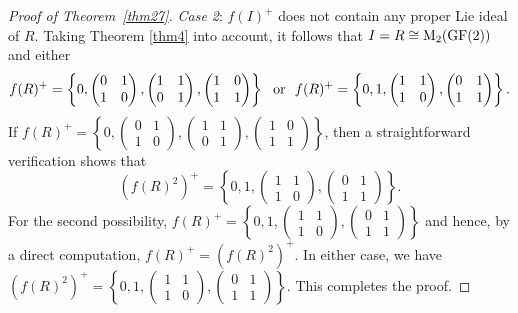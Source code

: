 \documentclass[11pt]{article}
\theoremstyle{definition}
\begin{document}
{{{{\begin{proof}[Proof of Theorem~\ref{thm27}]
					\textit{Case 2}: $f(I)^+$ does not contain any proper Lie ideal of $R$. 	Taking Theorem \ref{thm4} into account, it follows that
$I=R\cong {\rm M}_2({\rm GF}(2))$ and either
$$
f(R)^+=\left\{0, \begin{pmatrix}
						0 & 1 \\
						1 & 0
					\end{pmatrix}, \begin{pmatrix}
						1& 1 \\
						0 & 1
					\end{pmatrix},  \begin{pmatrix}
						1& 0 \\
						1 & 1
					\end{pmatrix}\right\}\ \ \text{\rm or}\ \
f(R)^+=\left\{0, 1, \begin{pmatrix}
						1 & 1 \\
						1 & 0
					\end{pmatrix}, \begin{pmatrix}
						0 & 1 \\
						1 & 1
					\end{pmatrix}\right\}.
$$	
If
$f(R)^+=\left\{0, \begin{pmatrix}
						0 & 1 \\
						1 & 0
					\end{pmatrix}, \begin{pmatrix}
						1& 1 \\
						0 & 1
					\end{pmatrix},  \begin{pmatrix}
						1& 0 \\
						1 & 1
					\end{pmatrix}\right\}$,
then a straightforward verification shows that
$$
(f(R)^2)^+=\left\{0, 1, \begin{pmatrix}
						1 & 1 \\
						1 & 0
					\end{pmatrix}, \begin{pmatrix}
						0 & 1 \\
						1 & 1
					\end{pmatrix}\right\}.
$$	
For the second possibility, $f(R)^+=\left\{0, 1, \begin{pmatrix}
						1 & 1 \\
						1 & 0
					\end{pmatrix}, \begin{pmatrix}
						0 & 1 \\
						1 & 1
					\end{pmatrix}\right\}$ and hence, by a direct computation, $f(R)^+=(f(R)^2)^+.$
In either case, we have
$
(f(R)^2)^+=\left\{0, 1, \begin{pmatrix}
						1 & 1 \\
						1 & 0
					\end{pmatrix}, \begin{pmatrix}
						0 & 1 \\
						1 & 1
					\end{pmatrix}\right\}.
$
This completes the proof.
				\end{proof}
				
}}}}
\end{document}
